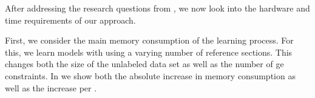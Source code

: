 
\bigskip

After addressing the research questions from , we now look into the hardware and time requirements of our approach.

First, we consider the main memory consumption of the learning process.
For this, we learn models with using a varying number of reference sections.
This changes both the size of the unlabeled data set as well as the number of \gls{ge} constraints.
In  we show both the absolute increase in memory consumption as well as the increase per .








